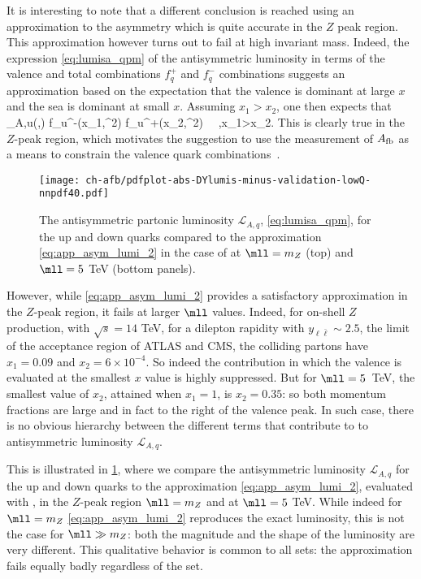 It is interesting to note that a different conclusion is reached using
an approximation to the asymmetry which is quite accurate  in the $Z$
peak region.
%
This approximation however turns out to fail at high
invariant mass.
%
Indeed, the expression \cref{eq:lumisa_qpm} of the antisymmetric
luminosity in terms of the valence 
and total \pdf combinations $f_q^+$ and $f_q^-$ \pdf combinations
suggests an approximation based on the expectation
that the valence is dominant at large $x$ and the sea is dominant at
small $x$. Assuming $x_1> x_2$, one then expects that
\be
{}_{A,u}(\yll,\mll) \approx{} f_u^-(x_1,\mll^2)
f_{u}^+(x_2,\mll^2)   \,  \, ,\quad x_1>x_2.
\label{eq:app_asym_lumi_2}
\ee
This is clearly true  in the $Z$-peak region, which  motivates the
suggestion to use the measurement of $A_{\rm fb}$ as a means to
 constrain the valence quark combinations~\cite{Accomando:2019vqt}.

\begin{figure}[!t]
 \centering
 \texttt{[image: ch-afb/pdfplot-abs-DYlumis-minus-validation-lowQ-nnpdf40.pdf]}
 \caption{The  antisymmetric partonic luminosity $\mathcal{L}_{A,q}$, \cref{eq:lumisa_qpm},
for the up and down quarks 
compared to the approximation 
\cref{eq:app_asym_lumi_2} in the case of 
at $\mll=m_Z$ (top)
and $\mll=5$ TeV (bottom panels).
 }    
 \label{fig:pdfplot-abs-DYlumis-minus-validation-lowQ-nnpdf40}
\end{figure}

However, while \cref{eq:app_asym_lumi_2} provides
a satisfactory approximation in the  $Z$-peak region,
it fails  at larger $\mll$ values. Indeed, for on-shell $Z$
production, with $\sqrt{s}=14$ TeV,
for a dilepton rapidity with $y_{\ell\bar{\ell}}\sim 2.5$, the limit of the
acceptance region
of ATLAS and CMS, the colliding partons have
$x_1=0.09$ and $x_2=6\times 10^{-4}$. So indeed the contribution in
which the valence \pdf is evaluated at the smallest $x$ value is highly suppressed.
%
But for $\mll=5$~TeV, the smallest value of $x_2$, attained when
$x_1=1$, is $x_2=0.35$: so both momentum fractions are large and in fact
to the right of the valence peak.
%
In such case, there 
is no obvious hierarchy between
the different terms that contribute to to antisymmetric
luminosity $\mathcal{L}_{A,q}$.

This is illustrated in
\cref{fig:pdfplot-abs-DYlumis-minus-validation-lowQ-nnpdf40},
where we compare the antisymmetric luminosity $\mathcal{L}_{A,q}$
for the up and down quarks 
to the approximation
\cref{eq:app_asym_lumi_2}, evaluated with  \nnlo,
in the $Z$-peak region $\mll=m_Z$ 
and at $\mll=5$ TeV.
%
While indeed for $\mll=m_Z$ \cref{eq:app_asym_lumi_2} reproduces
the exact luminosity, this is not the case for $\mll\gg m_Z$: both
the magnitude and the shape of the luminosity are  very different.
%
This qualitative behavior is common to all \pdf sets: the approximation
fails equally badly regardless of the \pdf set.

